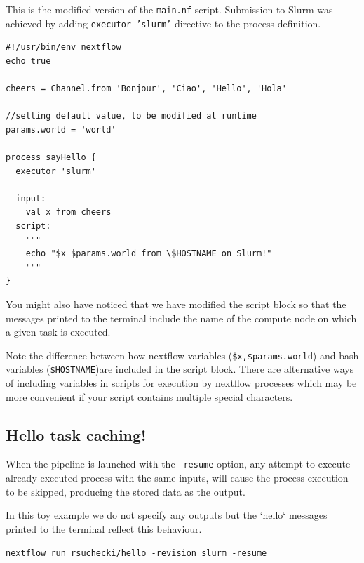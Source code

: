 This is the modified version of the \texttt{main.nf} script. 
Submission to Slurm was achieved by adding \texttt{executor 'slurm'} directive to the process definition.

\begin{lstlisting}
#!/usr/bin/env nextflow
echo true

cheers = Channel.from 'Bonjour', 'Ciao', 'Hello', 'Hola'

//setting default value, to be modified at runtime 
params.world = 'world' 

process sayHello {
  executor 'slurm'

  input:
    val x from cheers
  script:
    """
    echo "$x $params.world from \$HOSTNAME on Slurm!"
    """
}
\end{lstlisting}

You might also have noticed that we have modified the script block so that the messages printed to the terminal include the name of the compute node on which a given task is executed. 

\begin{warning}
Note the difference between how nextflow variables (\texttt{\$x,\$params.world}) and bash variables (\texttt{\$HOSTNAME})are included in the script block.
There are alternative ways of including variables in scripts for execution by nextflow processes which may be more convenient if your script contains multiple special characters.
\end{warning}


\subsection{Hello task caching!}

When the pipeline is launched with the \texttt{-resume} option, 
any attempt to execute already executed process with the same inputs,
will cause the process execution to be skipped, 
producing the stored data as the output.

In this toy example we do not specify any outputs 
but the `hello` messages printed to the terminal 
reflect this behaviour.


\begin{steps}
\begin{lstlisting}
nextflow run rsuchecki/hello -revision slurm -resume
\end{lstlisting}
\end{steps}

